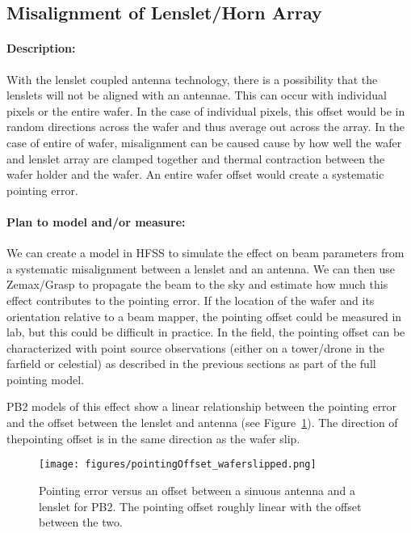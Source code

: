 \subsection{Misalignment of Lenslet/Horn Array}

\paragraph{Description:}
With the lenslet coupled antenna technology, there is a possibility that the lenslets will not be aligned with an antennae. This can occur with individual pixels or the entire wafer. In the case of individual pixels, this offset would be in random directions across the wafer and thus average out across the array. In the case of entire of wafer, misalignment can be caused cause by how well the wafer and lenslet array are clamped together and thermal contraction between the wafer holder and the wafer. An entire wafer offset would create a systematic pointing error.

\paragraph{Plan to model and/or measure:}
We can create a model in HFSS to simulate the effect on beam parameters from a systematic misalignment between a lenslet and an antenna. We can then use Zemax/Grasp to propagate the beam to the sky and estimate how much this effect contributes to the pointing error. If the location of the wafer and its orientation relative to a beam mapper, the pointing offset could be measured in lab, but this could be difficult in practice. In the field, the pointing offset can be characterized with point source observations (either on a tower/drone in the farfield or celestial) as described in the previous sections as part of the full pointing model.

PB2 models of this effect show a linear relationship between the pointing error and the offset between the lenslet and antenna (see Figure~\ref{poitingoffsetFromWaferslipped}). The direction of thepointing offset is in the same direction as the wafer slip. 
  
\begin{figure}
\centering
\texttt{[image: figures/pointingOffset\_waferslipped.png]}
\caption{Pointing error versus an offset between a sinuous antenna and a lenslet for PB2. The pointing offset roughly linear with the offset between the two.}
\label{poitingoffsetFromWaferslipped}
\end{figure}


